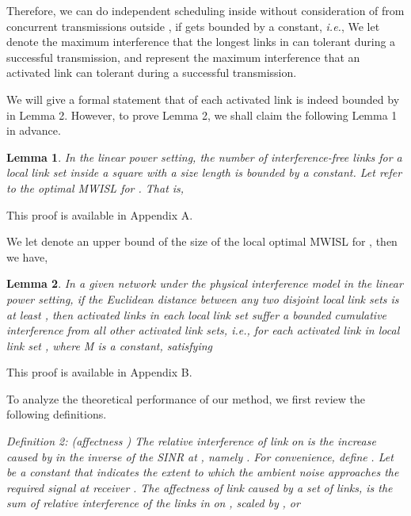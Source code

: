 \documentclass[journal]{IEEEtran}
\begin{document}
Therefore, we can do independent scheduling inside  without consideration of  from concurrent transmissions outside , if  gets bounded by a constant, \emph{i.e.},
\vspace*{-0.25\baselineskip}
{\small{
}}
We let  denote the maximum interference that the longest links in  can
tolerant during a successful transmission, and  represent the maximum interference
that  an activated link  can tolerant during a successful transmission.

We will give a formal statement that   of each activated link  is indeed bounded by  in Lemma 2. However, to prove Lemma 2, we shall claim the following Lemma 1 in advance.

\newtheorem{lemma}{Lemma}
\begin{lemma}
In the linear power setting, the number of interference-free links for a local
link set  inside a square  with a size length  is bounded by a constant. Let  refer to the optimal MWISL for . That is,
{\small{
}}
\vspace*{-0.5\baselineskip}
\label{lemma1}
\end{lemma}

\begin{IEEEproof}
This proof is available in Appendix A.
\end{IEEEproof}
We let  denote an upper bound of the size of the local optimal MWISL for , then we have,

\begin{lemma}
In a given network  under the physical interference model in the linear power setting, if the Euclidean distance between any two disjoint local link sets is at least , then activated links in each local link set suffer a bounded cumulative interference from all other activated link sets, \emph{i.e.}, for each activated link  in local link set ,
{\small{}}
where M is a constant, satisfying
{\small{}}
\vspace*{-0.5\baselineskip}
\label{lemma1}
\end{lemma}
\begin{IEEEproof}
This proof is available in Appendix B.
\end{IEEEproof}

To analyze the theoretical performance of our method, we first review the following definitions.

\textit{Definition 2: (affectness \cite{S:phy8}) The relative interference of link }\textit{ on }\textit{ is the increase caused by }\textit{ in the inverse of the SINR at }\textit{, namely }\textit{. For convenience, define }\textit{. Let }\textit{ be a constant that indicates the extent to which the ambient noise approaches the required signal at receiver }\textit{. The affectness of link }\textit{ caused by a set }\textit{ of links, is the sum of relative interference of the links in }\textit{ on }\textit{, scaled by }\textit{, or}
{\small{}}
\end{document}
